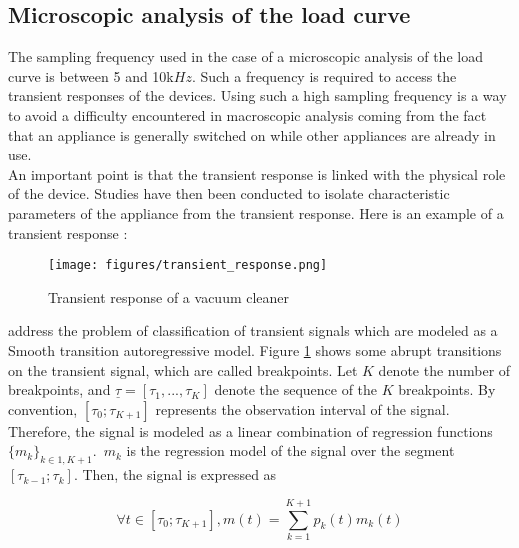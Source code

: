 
\subsection{Microscopic analysis of the load curve}
The sampling frequency used in the case of a microscopic analysis of the load curve is between 5 and 10k$Hz$. Such a frequency is required to access the transient responses of the devices. Using such a high sampling frequency is a way to avoid a difficulty encountered in macroscopic analysis coming from the fact that an appliance is generally switched on while other appliances are already in use. 
\\

An important point is that the transient response is linked with the physical role of the device. Studies have then been conducted to isolate characteristic parameters of the appliance from the transient response. Here is an example of a transient response :
\\

\begin{figure}[H]
\centering
\texttt{[image: figures/transient\_response.png]}
\caption{Transient response of a vacuum cleaner}
\label{fig:transient_response}
\end{figure}


\cite{research2} address the problem of classification of transient signals which are modeled as a Smooth transition autoregressive model. Figure \ref{fig:transient_response} shows some abrupt transitions on the transient signal, which are called breakpoints. Let $K$ denote the number of breakpoints, and $\underline{\tau} = [\tau_1,...,\tau_K]$ denote the sequence of the $K$ breakpoints. By convention, $[\tau_0;\tau_{K+1}]$ represents the observation interval of the signal. 
\\

 Therefore, the signal is modeled as a linear combination of regression functions $\{m_k\}_{k\in{1,K+1}}$.~$m_k$ is the regression model of the signal over the segment $[\tau_{k-1};\tau_{k}]$. Then, the signal is expressed as

\begin{equation}
\forall t\in [\tau_0;\tau_{K+1}],m(t)= \sum_{k=1}^{K+1}p_k(t)m_k(t)
\end{equation}

